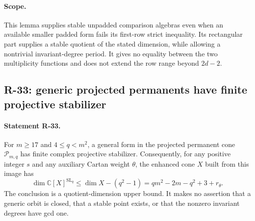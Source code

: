 \paragraph{Scope.}
This lemma supplies stable unpadded comparison algebras even
when an available smaller padded form fails its first-row
strict inequality. Its rectangular part supplies a stable
quotient of the stated dimension, while allowing a nontrivial
invariant-degree period. It gives no equality between the two
multiplicity functions and does not extend the row range
beyond $2d-2$.


\subsection{R-33: generic projected permanents have finite projective stabilizer}

\paragraph{Statement R-33.}
For $m\geq17$ and $4\leq q<m^2$, a general form in the
projected permanent cone $\mathcal P_{m,q}$ has finite complex
projective stabilizer. Consequently, for any positive integer
$s$ and any auxiliary Cartan weight $\theta$, the enhanced
cone $X$ built from this image has
\begin{equation}\label{R33:quotient_upper}
 \dim\mathbb C[X]^{\mathrm{SL}_q}
 \leq \dim X-(q^2-1)
 =q m^2-2m-q^2+3+r_\theta.
\end{equation}
The conclusion is a quotient-dimension upper bound. It makes
no assertion that a generic orbit is closed, that a stable
point exists, or that the nonzero invariant degrees have gcd
one.

